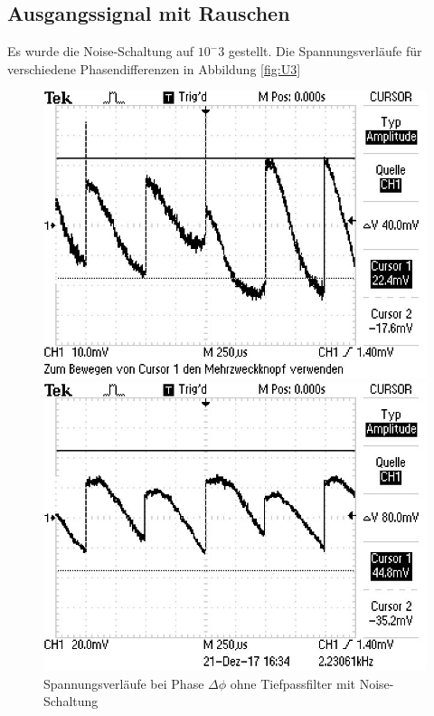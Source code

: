 \subsection{Ausgangssignal mit Rauschen}
\label{sec:mR}
Es wurde die Noise-Schaltung auf $10^-3$ gestellt. Die Spannungsverläufe für verschiedene Phasendifferenzen in Abbildung \ref{fig:U3}
\begin{figure}
\centering
\caption{Spannungsverläufe bei Phase $\Delta\phi$ ohne Tiefpassfilter mit Noise-Schaltung}
\begin{minipage}{0.48\textwidth}
\includegraphics[scale=0.6]{content/images/noise0.jpg}
\end{minipage}
\begin{minipage}{0.48\textwidth}
\includegraphics[scale=0.6]{content/images/noise45.jpg}

\end{minipage}
\end{figure}
